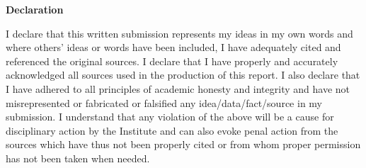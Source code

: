 \begin{Declaration}
\noindent
\begin{center}
    {\Large \textbf{Declaration}}\\
\end{center}
I declare that this written submission represents my ideas in my own words and 
where others' ideas or words have been included, I have adequately cited and 
referenced the original sources. I declare that I have properly and accurately 
acknowledged all sources used in the production of this report. I also declare 
that I have adhered to all principles of academic honesty and integrity and have
not misrepresented or fabricated or falsified any idea/data/fact/source in my submission. 
I understand that any violation of the above will be a cause for disciplinary 
action by the Institute and can also evoke penal action from the sources which 
have thus not been properly cited or from whom proper permission has not been 
taken when needed.


\DecSign[\today]
\end{Declaration}